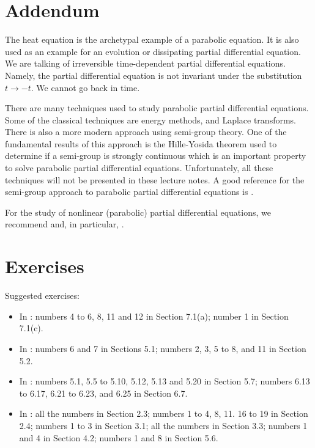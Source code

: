 \section{Addendum}

The heat equation is the archetypal example of a parabolic equation.
It is also used as an example for an evolution or dissipating partial
differential equation.  We are talking of irreversible time-dependent
partial differential equations.  Namely, the partial differential equation
is not invariant under the substitution $t \to -t$.  We cannot go back
in time.

There are many techniques used to study parabolic partial differential
equations.  Some of the classical techniques are energy methods, and
Laplace transforms.  There is also a more modern approach using
semi-group theory.  One of the fundamental results of this approach is
the Hille-Yosida theorem used to determine if a semi-group is strongly
continuous which is an important property to solve parabolic partial
differential equations.  Unfortunately, all these techniques will not
be presented in these lecture notes.  A good reference for the semi-group
approach to parabolic partial differential equations is \cite{He}.

For the study of nonlinear (parabolic) partial differential
equations, we recommend \cite{Smo} and, in particular, \cite{He}.

\section{Exercises}

Suggested exercises:

\begin{itemize}
\item In \cite{J}: numbers 4 to 6, 8, 11 and 12 in Section 7.1(a);
number 1 in Section 7.1(c).
\item In \cite{McO}: numbers 6 and 7 in Sections 5.1; numbers 2, 3, 5 to
8, and 11 in Section 5.2.
\item In \cite{PinRub}: numbers 5.1, 5.5 to 5.10, 5.12, 5.13 and 5.20
  in Section 5.7; numbers 6.13 to 6.17, 6.21 to 6.23, and 6.25 in Section 6.7. 
\item In \cite{Str}: all the numbers in Section 2.3; numbers 1 to 4, 8,
  11. 16 to 19 in Section 2.4; numbers 1 to 3 in Section 3.1; all
  the numbers in Section 3.3; numbers 1 and 4 in Section 4.2; numbers 1
  and 8 in Section 5.6.
\end{itemize}

